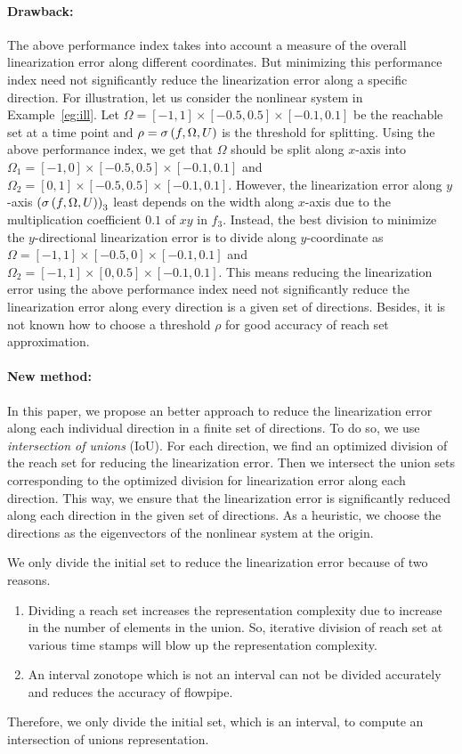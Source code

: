 \paragraph{Drawback:}  The above performance index takes into account a measure of the
overall linearization error along different coordinates.  But
minimizing this performance index need not significantly reduce the
linearization error along a specific direction.  For illustration, let
us consider the nonlinear system in Example~\ref{eg:ill}.  Let $\Omega
= [-1,1]\times[-0.5,0.5]\times[-0.1,0.1]$ be the reachable set at a
time point and $\rho = \sigma\left(f,\Omega,U\right)$ is the threshold for
splitting.  Using the above performance index, we get that $\Omega$
should be split along $x$-axis into $\Omega_1 =
[-1,0]\times[-0.5,0.5]\times[-0.1,0.1]$ and $\Omega_2 =
[0,1]\times[-0.5,0.5]\times[-0.1,0.1]$.  However, the linearization
error along $y$-axis $\left(\sigma\left(f,\Omega,U\right)\right)_3$ least depends on
the width along $x$-axis due to the multiplication coefficient $0.1$
of $xy$ in $f_3$.  Instead, the best division to minimize the
$y$-directional linearization error is to divide along $y$-coordinate
as $\Omega = [-1,1]\times[-0.5,0]\times[-0.1,0.1]$ and $\Omega_2 =
[-1,1]\times[0,0.5]\times[-0.1,0.1]$.  This means reducing the
linearization error using the above performance index need not
significantly reduce the linearization error along every direction is
a given set of directions.  Besides, it is not known how to choose a
threshold $\rho$ for good accuracy of reach set approximation.

\paragraph{New method:}  In this paper, we propose an better approach to
reduce the linearization error along each individual direction in a
finite set of directions.  To do so, we use \emph{intersection of
unions} (IoU).  For each direction, we find an optimized division of
the reach set for reducing the linearization error.  Then we intersect
the union sets corresponding to the optimized division for
linearization error along each direction.  This way, we ensure that
the linearization error is significantly reduced along each direction
in the given set of directions.  As a heuristic, we choose the
directions as the eigenvectors of the nonlinear system at the origin.

We only divide the initial set to reduce the linearization error
because of two reasons.
%
\begin{enumerate}
\item Dividing a reach set increases the representation complexity due to
increase in the number of elements in the union.  So, iterative
division of reach set at various time stamps will blow up the
representation complexity.
\item  An interval zonotope which is not an interval can not
be divided accurately and reduces the accuracy of flowpipe.
\end{enumerate}
%
Therefore, we only divide the initial set, which is an interval, to
compute an intersection of unions representation.
%
